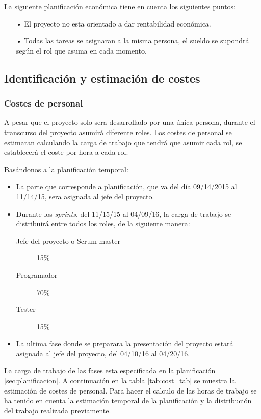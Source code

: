 
La siguiente planificación económica tiene en cuenta los siguientes puntos:
\begin{itemize}
\item[•]El proyecto no esta orientado a dar rentabilidad económica.
\item[•]Todas las tareas se asignaran a la misma persona, el sueldo se supondrá según el rol que asuma en cada momento. 
\end{itemize}

\subsection{Identificación y estimación de costes}
\subsubsection{Costes de personal}
A pesar que el proyecto solo sera desarrollado por una única persona, durante el transcurso del proyecto asumirá diferente roles. Los costes de personal se estimaran calculando la carga de trabajo que tendrá que asumir cada rol, se establecerá el coste por hora a cada rol.

Basándonos a la planificación temporal:
\begin{itemize}
\item La parte que corresponde a planificación, que va del día 09/14/2015 al 11/14/15, sera asignada al jefe del proyecto.
\item Durante los \textit{sprints}, del 11/15/15 al 04/09/16, la carga de trabajo se distribuirá entre todos los roles, de la siguiente manera:
\begin{description}
\item[Jefe del proyecto o Scrum master] 15\%
\item[Programador] 70\%
\item[Tester] 15\%
\end{description}
\item La ultima fase donde se preparara la presentación del proyecto estará asignada al jefe del proyecto, del 04/10/16 al 04/20/16.
\end{itemize}

La carga de trabajo de las fases esta especificada en la planificación \ref{sec:planificacion}. A continuación en la tabla \ref{tab:cost_tab} se muestra la estimación de costes de personal. Para hacer el calculo de las horas de trabajo se ha tenido en cuenta la estimación temporal de la planificación y la distribución del trabajo realizada previamente.

